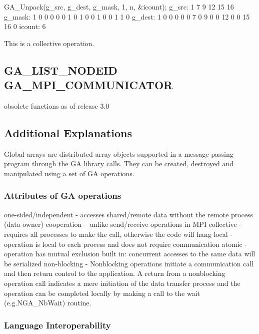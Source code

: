 GA\_Unpack(g\_src, g\_dest, g\_mask, 1, n, \&icount); g\_src: 1 7
9 12 15 16 g\_mask: 1 0 0 0 0 0 1 0 1 0 0 1 0 0 1 1 0 g\_dest: 1 0
0 0 0 0 7 0 9 0 0 12 0 0 15 16 0 icount: 6

This is a collective operation.


\subsection*{GA\_LIST\_NODEID GA\_MPI\_COMMUNICATOR}

obsolete functions as of release 3.0


\subsection*{Additional Explanations }

Global arrays are distributed array objects supported in a message-passing
program through the GA library calls. They can be created, destroyed
and manipulated using a set of GA operations. 


\subsubsection*{Attributes of GA operations }

one-sided/independent - accesses shared/remote data without the remote
process (data owner) cooperation -- unlike send/receive operations
in MPI collective - requires all processes to make the call, otherwise
the code will hang local - operation is local to each process and
does not require communication atomic - operation has mutual exclusion
built in: concurrent accesses to the same data will be serialized
non-blocking - Nonblocking operations initiate a communication call
and then return control to the application. A return from a nonblocking
operation call indicates a mere initiation of the data transfer process
and the operation can be completed locally by making a call to the
wait (e.g.NGA\_NbWait) routine.


\subsubsection*{Language Interoperability }

